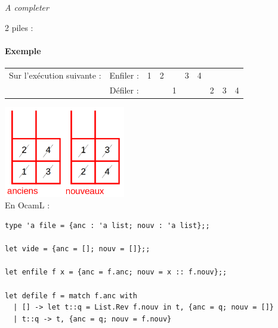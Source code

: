 
\textit{A completer}

2 piles : 

\paragraph{Exemple} \begin{tabular}{cccccccccc}
	Sur l'exécution suivante : & Enfiler : & 1 & 2 & & 3 & 4 &&&\\
	& Défiler : & & &  1 & & & 2 & 3 & 4
\end{tabular}

\includegraphics[height = 4cm]{Developpements/implementation paps/execution_paps.png} \\

En OcamL :

\begin{lstlisting}
type 'a file = {anc : 'a list; nouv : 'a list};;

let vide = {anc = []; nouv = []};;

let enfile f x = {anc = f.anc; nouv = x :: f.nouv};;

let defile f = match f.anc with
  | [] -> let t::q = List.Rev f.nouv in t, {anc = q; nouv = []}
  | t::q -> t, {anc = q; nouv = f.nouv}
\end{lstlisting}

